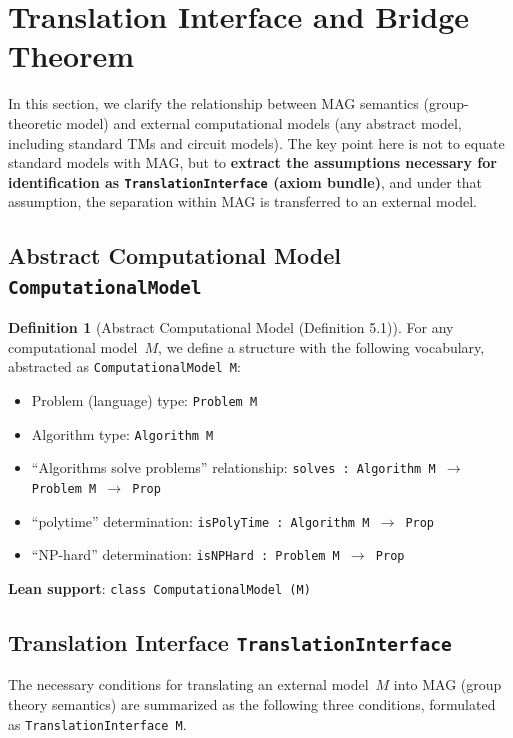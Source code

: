 \documentclass[11pt,a4paper]{article}
\theoremstyle{plain}
\theoremstyle{definition}
\newtheorem{definition}[theorem]{Definition}
\newcommand{\TranslationInterface}{\texttt{TranslationInterface}}
\newcommand{\ComputationalModel}{\texttt{ComputationalModel}}
\newcommand{\lean}[1]{\texttt{#1}}
\begin{document}
\section{Translation Interface and Bridge Theorem}

In this section, we clarify the relationship between MAG semantics (group-theoretic model) and external computational models (any abstract model, including standard TMs and circuit models). The key point here is not to equate standard models with MAG, but to \textbf{extract the assumptions necessary for identification as \TranslationInterface{} (axiom bundle)}, and under that assumption, the separation within MAG is transferred to an external model.

\subsection{Abstract Computational Model \ComputationalModel{}}

\begin{definition}[Abstract Computational Model (Definition 5.1)]
For any computational model~$M$, we define a structure with the following vocabulary, abstracted as \lean{ComputationalModel M}:
\begin{itemize}[nosep]
\item Problem (language) type: \lean{Problem M}
\item Algorithm type: \lean{Algorithm M}
\item ``Algorithms solve problems'' relationship: \lean{solves : Algorithm M $\to$ Problem M $\to$ Prop}
\item ``polytime'' determination: \lean{isPolyTime : Algorithm M $\to$ Prop}
\item ``NP-hard'' determination: \lean{isNPHard : Problem M $\to$ Prop}
\end{itemize}
\textbf{Lean support}: \lean{class ComputationalModel (M)}
\end{definition}

\subsection{Translation Interface \TranslationInterface{}}

The necessary conditions for translating an external model~$M$ into MAG (group theory semantics) are summarized as the following three conditions, formulated as \lean{TranslationInterface M}.
\end{document}
